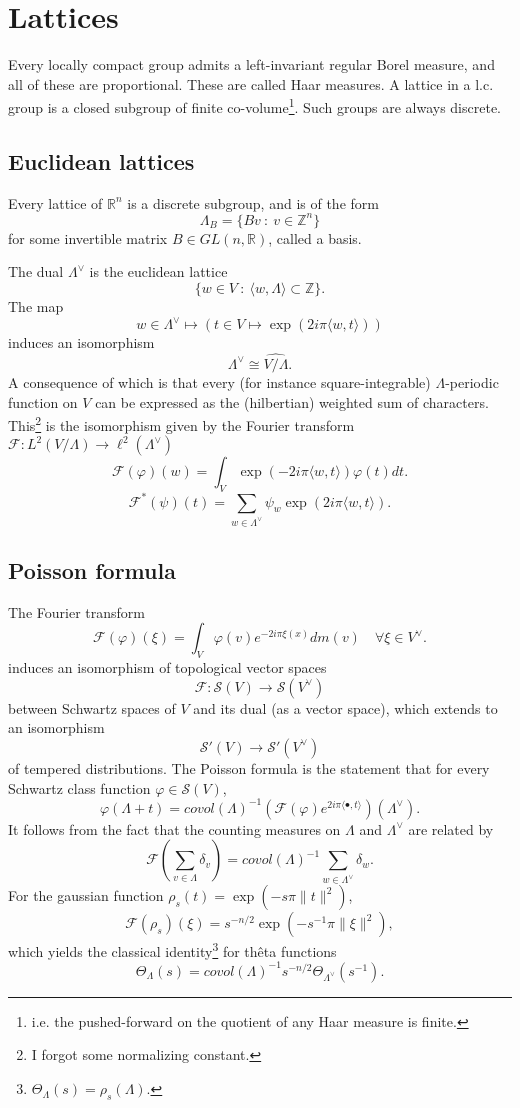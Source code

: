 \documentclass{article}
\begin{document}
\newpage	%
\section{Lattices}

Every locally compact group admits a left-invariant regular Borel measure, and all of these are proportional. These are called Haar measures. A lattice in a l.c. group is a closed subgroup of finite co-volume\footnote{i.e. the pushed-forward on the quotient of any Haar measure is finite.}. Such groups are always discrete. 

\subsection{Euclidean lattices}
Every lattice of $\mathbb R^n$ is a discrete subgroup, and is of the form 
\[\Lambda_B = \{ Bv \ : \ v\in \mathbb Z^n\} \]
for some invertible matrix $B\in GL(n,\mathbb R)$, called a basis. 

The dual $\Lambda^\vee$ is the euclidean lattice
\[\{ w \in V \ : \  \langle w , \Lambda \rangle \subset \mathbb Z \}.\]
The map 
$$w \in \Lambda^\vee \mapsto \left(t\in V \mapsto \exp(2i\pi \langle w,t \rangle)\right)$$ 
induces an isomorphism 
\[\Lambda^\vee \cong \widehat{V/\Lambda}.\] 
A consequence of which is that every (for instance square-integrable) $\Lambda$-periodic function on $V$ can be expressed as the (hilbertian) weighted sum of characters. This\footnote{I forgot some normalizing constant.} is the isomorphism given by the Fourier transform $\mathcal F : L^2(V/\Lambda ) \rightarrow \ell^2(\Lambda^\vee) $
\[\mathcal F(\varphi)(w) = \int_V \exp(-2i\pi \langle w,t \rangle) \varphi(t)dt. \]
\[\mathcal F^{*}(\psi)(t) = \sum_{w\in\Lambda^\vee} \psi_w \exp(2i\pi \langle w,t \rangle) . \]

\subsection{Poisson formula}
The Fourier transform
\[\mathcal F(\varphi ) (\xi ) = \int_V \varphi(v)e^{-2i\pi \xi(x)} dm(v) \quad\forall \xi \in V^\vee.\]
induces an isomorphism of topological vector spaces
\[\mathcal F : \mathcal S(V) \rightarrow \mathcal S(V^\vee)\]
between Schwartz spaces of $V$ and its dual (as a vector space), which extends to an isomorphism
\[\mathcal S'(V) \rightarrow \mathcal S'(V^\vee)\]
of tempered distributions.
The Poisson formula is the statement that for every Schwartz class function $\varphi\in\mathcal S(V)$, 
\[ \varphi (\Lambda + t) = covol(\Lambda)^{-1}(\mathcal F(\varphi)e^{2i\pi \langle \bullet , t\rangle }) (\Lambda^\vee).\]
It follows from the fact that the counting measures on $\Lambda$ and $\Lambda^\vee$ are related by 
\[\mathcal F(\sum_{v\in \Lambda} \delta_{v} ) = covol(\Lambda)^{-1}\sum_{w\in \Lambda^\vee} \delta_w .\]
For the gaussian function $\rho_s(t) = \exp(-s\pi\|t\|^2)$, 
\[\mathcal F(\rho_s)(\xi)= s^{-n/2}\exp(-s^{-1}\pi\|\xi\|^2 ),\]
which yields the classical identity\footnote{$\Theta_{\Lambda}(s) = \rho_s(\Lambda)$.} for thêta functions
\[ \Theta_{\Lambda}(s) = covol(\Lambda)^{-1}s^{-n/2}\Theta_{\Lambda^\vee}(s^{-1}).\]
\end{document}
